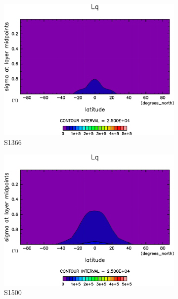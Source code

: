 \documentclass[body]{subfiles}
\begin{document}
\begin{figure}[t]
	\centering
	\begin{subfigure}{.4\textwidth}
		\centering
		\includegraphics[width=\textwidth]{S1366/Lq,time=14600:14965-crop-rotate.pdf}
		\caption{S1366}\label{LqS1366}
	\end{subfigure}
	\begin{subfigure}{.4\textwidth}
		\centering
		\includegraphics[width=\textwidth]{S1500/Lq,time=3650:4015-crop-rotate.pdf}
		\caption{S1500}\label{LqS1500}
	\end{subfigure}
	\begin{subfigure}{.4\textwidth}
		\centering

\end{subfigure}
\end{figure}
\end{document}
